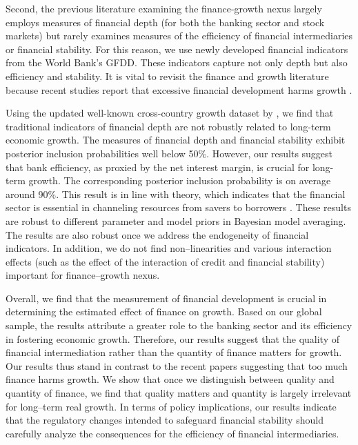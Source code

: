 \begin{refsection}
Second, the previous literature examining the finance-growth nexus largely employs measures of financial depth (for both the banking sector and stock markets) but rarely examines measures of the efficiency of financial intermediaries or financial stability. For this reason, we use newly developed financial indicators from the World Bank's \ac{GFDD}. These indicators capture not only depth but also efficiency and stability. It is vital to revisit the finance and growth literature because recent studies report that excessive financial development harms growth \parencite{CecchettiKharroubi2012}.

Using the updated well-known cross-country growth dataset by \textcite{Fernandezetal2001}, we find that traditional indicators of financial depth are not robustly related to long-term economic growth. The measures of financial depth and financial stability exhibit posterior inclusion probabilities well below 50\%. However, our results suggest that bank efficiency, as proxied by the net interest margin, is crucial for long-term growth. The corresponding posterior inclusion probability is on average around 90\%. This result is in line with theory, which indicates that the financial sector is essential in channeling resources from savers to borrowers \textcite{Pagano1993}. These results are robust to different parameter and model priors in Bayesian model averaging. The results are also robust once we address the endogeneity of financial indicators. In addition, we do not find non--linearities and various interaction effects (such as the effect of the interaction of credit and financial stability) important for finance--growth nexus. 

Overall, we find that the measurement of financial development is crucial in determining the estimated effect of finance on growth. Based on our global sample, the results attribute a greater role to the banking sector and its efficiency in fostering economic growth. Therefore, our results suggest that the quality of financial intermediation rather than the quantity of finance matters for growth. Our results thus stand in contrast to the recent papers suggesting that too much finance harms growth. We show that once we distinguish between quality and quantity of finance, we find that quality matters and quantity is largely irrelevant for long--term real growth. In terms of policy implications, our results indicate that the regulatory changes intended to safeguard financial stability should carefully analyze the consequences for the efficiency of financial intermediaries.


\end{refsection}
